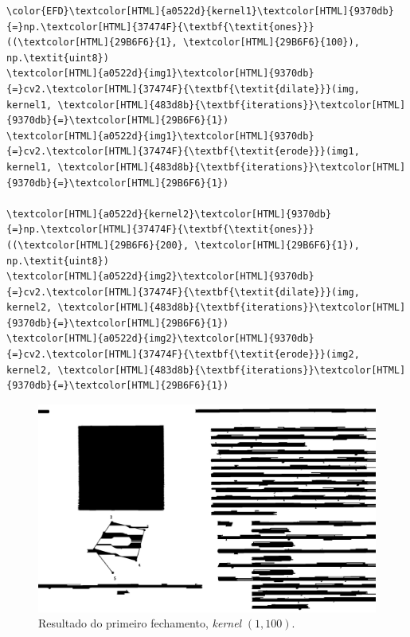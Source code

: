 \documentclass[twocolumn, 10pt]{article}
\begin{document}
\begin{Code}
\begin{Verbatim}
\color{EFD}\textcolor[HTML]{a0522d}{kernel1}\textcolor[HTML]{9370db}{=}np.\textcolor[HTML]{37474F}{\textbf{\textit{ones}}}((\textcolor[HTML]{29B6F6}{1}, \textcolor[HTML]{29B6F6}{100}), np.\textit{uint8})
\textcolor[HTML]{a0522d}{img1}\textcolor[HTML]{9370db}{=}cv2.\textcolor[HTML]{37474F}{\textbf{\textit{dilate}}}(img, kernel1, \textcolor[HTML]{483d8b}{\textbf{iterations}}\textcolor[HTML]{9370db}{=}\textcolor[HTML]{29B6F6}{1})
\textcolor[HTML]{a0522d}{img1}\textcolor[HTML]{9370db}{=}cv2.\textcolor[HTML]{37474F}{\textbf{\textit{erode}}}(img1, kernel1, \textcolor[HTML]{483d8b}{\textbf{iterations}}\textcolor[HTML]{9370db}{=}\textcolor[HTML]{29B6F6}{1})

\textcolor[HTML]{a0522d}{kernel2}\textcolor[HTML]{9370db}{=}np.\textcolor[HTML]{37474F}{\textbf{\textit{ones}}}((\textcolor[HTML]{29B6F6}{200}, \textcolor[HTML]{29B6F6}{1}), np.\textit{uint8})
\textcolor[HTML]{a0522d}{img2}\textcolor[HTML]{9370db}{=}cv2.\textcolor[HTML]{37474F}{\textbf{\textit{dilate}}}(img, kernel2, \textcolor[HTML]{483d8b}{\textbf{iterations}}\textcolor[HTML]{9370db}{=}\textcolor[HTML]{29B6F6}{1})
\textcolor[HTML]{a0522d}{img2}\textcolor[HTML]{9370db}{=}cv2.\textcolor[HTML]{37474F}{\textbf{\textit{erode}}}(img2, kernel2, \textcolor[HTML]{483d8b}{\textbf{iterations}}\textcolor[HTML]{9370db}{=}\textcolor[HTML]{29B6F6}{1})
\end{Verbatim}
\end{Code}
\begin{figure}[htbp]
\centering
\includegraphics[width=.9\linewidth]{./img/step2.png}
\caption{Resultado do primeiro fechamento, \emph{kernel} \((1,100)\).}
\end{figure}
\end{document}
